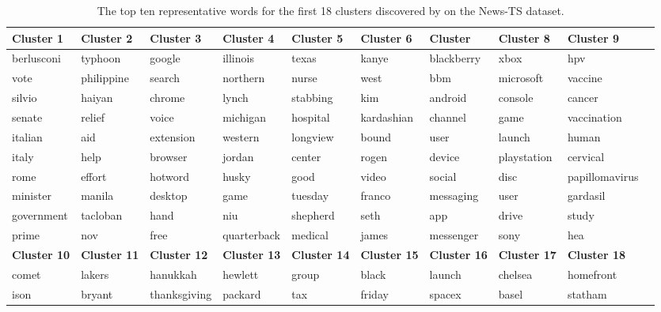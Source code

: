 \begin{table}[htbp]
\centering
\renewcommand{\arraystretch}{1.2} %
\setlength{\tabcolsep}{7pt} %
\caption{The top ten representative words for the first 18 clusters discovered by \sysname{} on the News-TS dataset.}
\label{tab:clusters}
\begin{tabular}{|l|l|l|l|l|l|l|l|l|l|}
\hline
\textbf{Cluster 1} & \textbf{Cluster 2} & \textbf{Cluster 3} & \textbf{Cluster 4} & \textbf{Cluster 5} & \textbf{Cluster 6} & \textbf{Cluster} & \textbf{Cluster 8} & \textbf{Cluster 9} \\
\hline
berlusconi  & typhoon	  & google	   & illinois	 & texas	 	   & kanye	    & blackberry	 & xbox	    & hpv	 \\
vote	   & philippine	 & search	  & northern	 & nurse	 	   & west	    & bbm	         & microsoft&	vaccine	 \\
silvio	   & haiyan	     & chrome	  & lynch	     & stabbing	 	   & kim	    & android	     & console	& cancer	\\
senate	   & relief	   & voice	      & michigan	 & hospital	 	   & kardashian	 & channel	   & game	     & vaccination	\\
italian	   & aid	    & extension	    & western	 & longview	 	   & bound	    & user	      & launch	 & human	\\
italy	   & help	    & browser	    & jordan	 & center	 	   & rogen	    & device	 & playstation	& cervical	\\
rome	    & effort	 & hotword	    & husky	     & good	     	   & video	    & social	 & disc	 &papillomavirus	\\
minister	& manila	& desktop	   & game	     & tuesday	 	   & franco	    & messaging	 & user	 &gardasil	\\
government	& tacloban & hand	     & niu	         & shepherd	 	   & seth	    & app	     & drive	&study	 \\
prime	     & nov	  & free         & quarterback	 & medical	 	   & james	    & messenger	 & sony	&hea \\
\hline
\textbf{Cluster 10} & \textbf{Cluster 11} & \textbf{Cluster 12} & \textbf{Cluster 13} & \textbf{Cluster 14} & \textbf{Cluster 15} & \textbf{Cluster 16} & \textbf{Cluster 17} & \textbf{Cluster 18}\\
\hline
comet	     & lakers	    & hanukkah	     & hewlett	 & group	      	 & black	    & launch		 & chelsea	    &homefront	\\
ison	     & bryant	    & thanksgiving	 & packard	 & tax	          	 & friday	    & spacex		 & basel		& statham	\\

\end{tabular}
\end{table}
